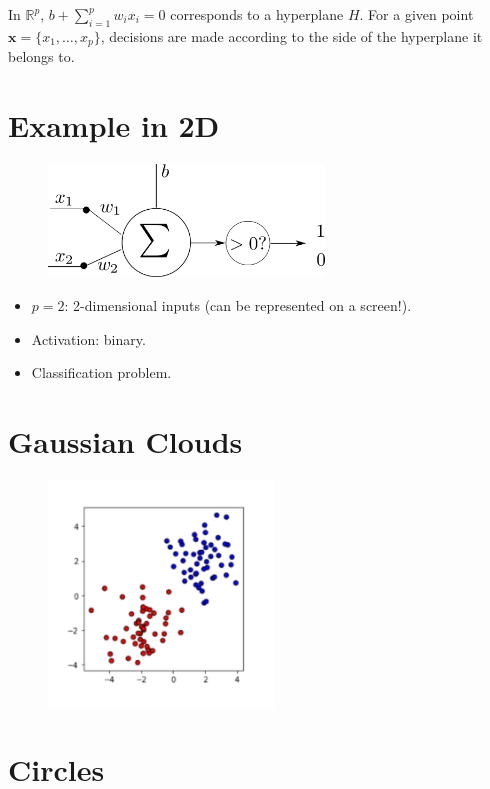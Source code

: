 \documentclass{book}
\newcommand{\x}{\mathbf{x}}
\newcommand{\R}{\mathbb{R}}
\begin{document}
\begin{myblock}{}
In $\R^p$, $b + \sum\limits_{i=1}^p w_ix_i = 0$ corresponds to a hyperplane $H$. For a given point $\x = \{x_1, \ldots, x_p\}$, decisions are made according to the side of the hyperplane it belongs to.
\end{myblock}

\section{Example in 2D}

\begin{figure}[h]
    \centering
    \includegraphics[height=3cm]{neurone_simple}
\end{figure}

\begin{itemize}
\item $p=2$: 2-dimensional inputs (can be represented on a screen!).
\item Activation: binary.
\item Classification problem.
\end{itemize}

\section{Gaussian Clouds}

\begin{figure}[h]
    \centering
    \includegraphics[height=6cm]{gaussian_clouds}
\end{figure}

\section{Circles}
\end{document}
